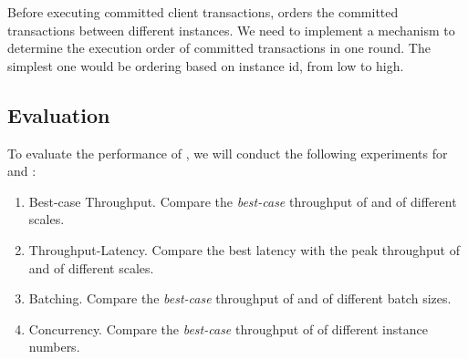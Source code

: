 \par Before executing committed client transactions, \RCC{} orders the committed transactions between 
different instances.  We need to implement a mechanism to determine the execution order of committed transactions 
in one round. The simplest one would be ordering based on instance id, from low to high.

\subsection{Evaluation}

\par To evaluate the performance of \RCC{}, we will conduct the following experiments for \RCC{} and \PBFT{}:

\begin{enumerate}
    \item Best-case Throughput. Compare the \emph{best-case} throughput of \RCC{} and \PBFT{} of different scales.
    \item Throughput-Latency. Compare the best latency with the peak throughput of \RCC{} and \PBFT{} of different scales.
    \item Batching. Compare the \emph{best-case} throughput of \RCC{} and \PBFT{} of different batch sizes.
    \item Concurrency. Compare the \emph{best-case} throughput of \RCC{} of different instance numbers.
\end{enumerate}